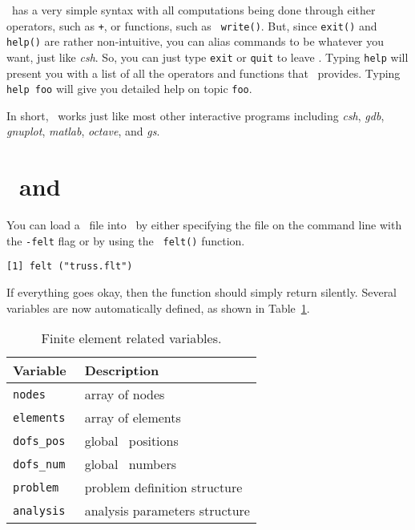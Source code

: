 \burlap\ has a very simple syntax with all computations being done
through either operators, such as {\tt +}, or functions, such as {\tt
write()}.  But, since {\tt exit()} and {\tt help()} are rather
non-intuitive, you can alias commands to be whatever you want, just
like {\em csh}.  So, you can just type {\tt exit} or {\tt quit} to
leave \burlap.  Typing {\tt help} will present you with a list of all
the operators and functions that \burlap\ provides.  Typing {\tt help
foo} will give you detailed help on topic {\tt foo}.

In short, \burlap\ works just like most other interactive programs
including {\em csh}, {\em gdb}, {\em gnuplot}, {\em matlab}, {\em
octave}, and {\em gs}.


\section{\burlap\ and \felt}
\label{burlap.felt}

You can load a \felt\ file into \burlap\ by either specifying the file
on the command line with the {\tt -felt} flag or by using the {\tt
felt()} function.

\begin{screen}
\begin{verbatim}
[1] felt ("truss.flt")
\end{verbatim}
\end{screen}

If everything goes okay, then the function should simply return
silently.  Several variables are now automatically defined, as
shown in Table~\ref{burlap.fe.variables}.

\begin{table}[htbp]
\begin{center}
\begin{tabular}{l|l}
Variable	& Description			\\
\hline
\tt nodes	& array of nodes		\\
\tt elements	& array of elements		\\
\tt dofs\_pos	& global \dof\ positions	\\
\tt dofs\_num	& global \dof\ numbers		\\
\tt problem	& problem definition structure	\\
\tt analysis	& analysis parameters structure	\\
\end{tabular}
\caption{Finite element related variables.}
\label{burlap.fe.variables}
\end{center}
\end{table}

